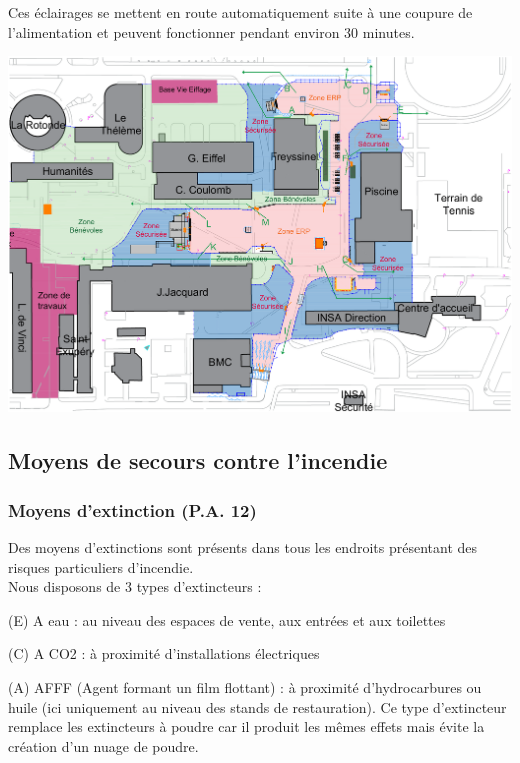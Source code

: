 \documentclass[hidelinks, paper=a4, fontsize=13pt]{report}
\begin{document}
Ces éclairages se mettent en route automatiquement suite à une coupure de l’alimentation et peuvent fonctionner pendant environ 30 minutes. 


\begin{center}
	\includegraphics[width=.8\textwidth,keepaspectratio]{Exports/Plan_24h_45eme-Blocs_Phares}
\end{center}


\subsection{Moyens de secours contre l’incendie}
\label{moyensSecoursIncendie}
\subsubsection{Moyens d’extinction (P.A. 12)}

Des moyens d’extinctions sont présents dans tous les endroits présentant des risques particuliers d’incendie.\\
Nous disposons de 3 types d’extincteurs :
\begin{list}{•}{}
	\item (E) A eau : au niveau des espaces de vente, aux entrées et aux toilettes
	\item (C) A CO2 : à proximité d’installations électriques 
	\item (A) AFFF (Agent formant un film flottant) : à proximité d’hydrocarbures ou huile (ici uniquement au niveau des stands de restauration). Ce type d’extincteur remplace les extincteurs à poudre car il produit les mêmes effets mais évite la création d’un nuage de poudre.
\end{list} \mbox{}\\
\end{document}
